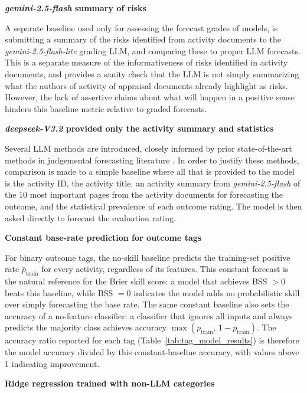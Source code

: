 \textbf{\emph{gemini-2.5-flash} summary of risks}

A separate baseline used only for assessing the forecast grades of models, is submitting a summary of the risks identified from activity documents to the \emph{gemini-2.5-flash-lite} grading LLM, and comparing these to proper LLM forecasts. This is a separate measure of the informativeness of risks identified in activity documents, and provides a sanity check that the LLM is not simply summarizing what the authors of activity of appraisal documents already highlight as risks. However, the lack of assertive claims about what will happen in a positive sense hinders this baseline metric relative to graded forecasts.

\textbf{\emph{deepseek-V3.2} provided only the activity summary and statistics}

Several LLM methods are introduced, closely informed by prior state-of-the-art methods in judgemental forecasting literature \citep{halawiApproachingHumanLevelForecasting2024} \citep{leeAdvancingEventForecasting2025}. In order to justify these methods, comparison is made to a simple baseline where all that is provided to the model is the activity ID, the activity title, an activity summary from \emph{gemini-2.5-flash} of the 10 most important pages from the activity documents for forecasting the outcome, and the statistical prevalence of each outcome rating. The model is then asked directly to forecast the evaluation rating.

\textbf{Constant base-rate prediction for outcome tags}

For binary outcome tags, the no-skill baseline predicts the training-set positive rate $\bar{p}_{\text{train}}$ for every activity, regardless of its features. This constant forecast is the natural reference for the Brier skill score: a model that achieves BSS $> 0$ beats this baseline, while BSS $= 0$ indicates the model adds no probabilistic skill over simply forecasting the base rate. The same constant baseline also sets the accuracy of a no-feature classifier: a classifier that ignores all inputs and always predicts the majority class achieves accuracy $\max(\bar{p}_{\text{train}},\, 1-\bar{p}_{\text{train}})$. The accuracy ratio reported for each tag (Table~\ref{tab:tag_model_results}) is therefore the model accuracy divided by this constant-baseline accuracy, with values above 1 indicating improvement.

\textbf{Ridge regression trained with non-LLM categories}

